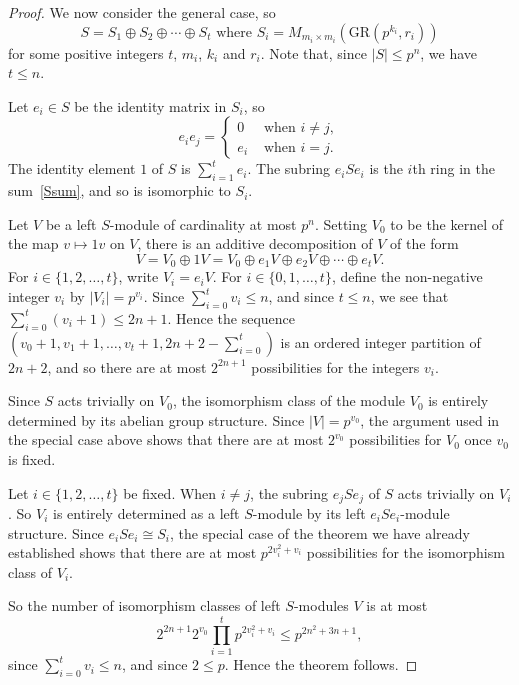 \documentclass[12pt]{article}
\begin{document}
\begin{proof}
We now consider the general case, so
\begin{equation}
\label{Ssum}
S=S_1\oplus S_2\oplus\cdots\oplus S_t\text{ where }S_i=M_{m_i\times m_i}(\mathrm{GR}(p^{k_i},r_i))
\end{equation}
for some positive integers $t$, $m_i$, $k_i$ and $r_i$. Note that, since $|S|\leq p^n$, we have~$t\leq n$. 

Let $e_i\in S$ be the identity matrix in $S_i$, so
\[
e_ie_j=\begin{cases} 0&\text{ when }i\not=j,\\
e_i&\text{ when }i=j.
\end{cases}
\]
The identity element $1$ of $S$ is $\sum_{i=1}^t e_i$. The subring $e_iSe_i$ is the $i$th ring in the sum~\eqref{Ssum}, and so is isomorphic to $S_i$.

Let $V$ be a left $S$-module of cardinality at most $p^n$. Setting $V_0$ to be the kernel of the map $v\mapsto 1v$ on $V$, there is an additive decomposition of $V$ of the form
\[
V=V_0\oplus 1V=V_0\oplus e_1V\oplus e_2V\oplus\cdots\oplus e_tV.
\]
For $i\in\{1,2,\ldots,t\}$, write $V_i=e_iV$. For $i\in\{0,1,\ldots,t\}$, define the non-negative integer $v_i$ by $|V_i|=p^{v_i}$. Since $\sum_{i=0}^t v_i\leq n$, and since $t\leq n$, we see that $\sum_{i=0}^t (v_i+1)\leq 2n+1$. Hence the sequence $(v_0+1,v_1+1,\ldots ,v_t+1,2n+2-\sum_{i=0}^t)$ is an ordered integer partition of $2n+2$, and so there are at most $2^{2n+1}$ possibilities for the integers $v_i$.

Since $S$ acts trivially on $V_0$, the isomorphism class of the module $V_0$ is entirely determined by its abelian group structure. Since $|V|=p^{v_0}$, the argument used in the special case above shows that there are at most $2^{v_0}$ possibilities for $V_0$ once $v_0$ is fixed.

Let $i\in\{1,2,\ldots,t\}$ be fixed. When $i\not=j$, the subring $e_jSe_j$ of $S$ acts trivially on $V_i$. So $V_i$ is entirely determined as a left $S$-module by its left $e_iSe_i$-module structure. Since $e_iSe_i\cong S_i$, the special case of the theorem we have already established shows that there are at most $p^{2v_i^2+v_i}$ possibilities for the isomorphism class of $V_i$. 

So the number of isomorphism classes of left $S$-modules $V$ is at most
\[
2^{2n+1}2^{v_0}\prod_{i=1}^t p^{2v_i^2+v_i}\leq p^{2n^2+3n+1},
\]
since $\sum_{i=0}^tv_i\leq n$, and since $2\leq p$. Hence the theorem follows.
\end{proof}
\end{document}
